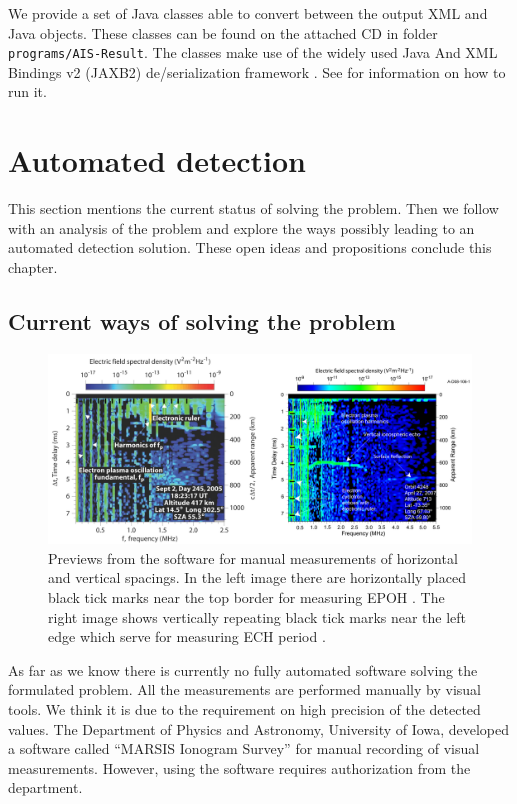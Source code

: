 We provide a set of Java classes able to convert between the output XML and Java objects. These classes can be found on the attached CD in folder \texttt{programs/AIS-Result}. The classes make use of the widely used Java And XML Bindings v2 (JAXB2) de/serialization framework \citep{Java.net2013}. See  for information on how to run it.

\section{Automated detection}
This section mentions the current status of solving the problem. Then we follow with an analysis of the problem and explore the ways possibly leading to an automated detection solution. These open ideas and propositions conclude this chapter.

\subsection{Current ways of solving the problem}  

\begin{figure}
	\centering
	\includegraphics[width=140mm]{images/rulers.png}
	\caption{Previews from the software for manual measurements of horizontal and vertical spacings. In the left image there are horizontally placed black tick marks near the top border for measuring EPOH \citep{Duru2008}. The right image shows vertically repeating black tick marks near the left edge which serve for measuring ECH period \citep{Akalin2010}.}
	\label{fig:rulers}
\end{figure}

As far as we know there is currently no fully automated software solving the formulated problem. All the measurements are performed manually by visual tools. We think it is due to the requirement on high precision of the detected values. The Department of Physics and Astronomy, University of Iowa, developed a software called ``MARSIS Ionogram Survey'' for manual recording of visual measurements. However, using the software requires authorization from the department.

